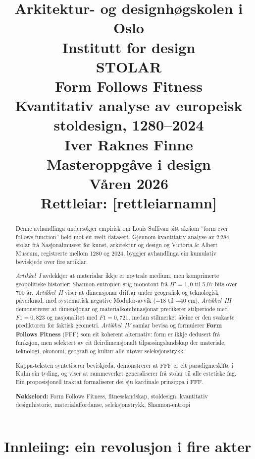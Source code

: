 \documentclass[10pt, a4paper, twocolumn]{article}
\title{%
  \vspace{-2cm}
  {\large Arkitektur- og designhøgskolen i Oslo}\\
  {\large Institutt for design}\\[2cm]
  {\Huge\textbf{STOLAR}}\\[0.5em]
  {\LARGE Form Follows Fitness}\\[0.5em]
  {\large Kvantitativ analyse av europeisk stoldesign, 1280--2024}\\[3cm]
  {\normalsize Iver Raknes Finne}\\[0.5em]
  {\small Masteroppgåve i design}\\
  {\small Våren 2026}\\[1em]
  {\small Rettleiar: [rettleiarnamn]}
}
\author{}
\date{}
\begin{document}
\maketitle
\thispagestyle{empty}
\newpage

\begin{abstract}
\noindent Denne avhandlinga undersøkjer empirisk om Louis Sullivan sitt aksiom ``form ever follows function'' held mot eit reelt datasett. Gjennom kvantitativ analyse av 2\,284 stolar frå Nasjonalmuseet for kunst, arkitektur og design og Victoria \& Albert Museum, registrerte mellom 1280 og 2024, byggjer avhandlinga ein kumulativ beviskjede over fire artiklar.

\emph{Artikkel~I} avdekkjer at materialar ikkje er nøytrale medium, men komprimerte geopolitiske historier: Shannon-entropien stig monotont frå $H' = 1{,}0$ til 5,07 bits over 700 år. \emph{Artikkel~II} viser at dimensjonar driftar under geografisk og teknologisk påverknad, med systematisk negative Modulor-avvik ($-18$ til $-40$ cm). \emph{Artikkel~III} demonstrerer at dimensjonar og materialkombinasjonar predikerer stilperiode med $F1 = 0{,}823$ og nasjonalitet med $F1 = 0{,}721$, medan stilmerket åleine er den svakaste prediktoren for faktisk geometri. \emph{Artikkel~IV} samlar bevisa og formulerer \textbf{Form Follows Fitness} (FFF) som eit koherent alternativ: form er ikkje dedusert frå funksjon, men selektert av eit fleirdimensjonalt tilpassingslandskap der materiale, teknologi, økonomi, geografi og kultur alle utøver seleksjonstrykk.

Kappa-teksten syntetiserer beviskjeda, demonstrerer at FFF er eit paradigmeskifte i Kuhn sin tyding, og viser at rammeverket generaliserer frå stolar til alle estetiske fag. Ein proposisjonell traktat formaliserer dei sju kardinale prinsippa i FFF.

\medskip
\noindent\textbf{Nøkkelord:} Form Follows Fitness, fitnesslandskap, stoldesign, kvantitativ designhistorie, materialaffordanse, seleksjonstrykk, Shannon-entropi
\end{abstract}

\newpage
\tableofcontents
\newpage


\section{Innleiing: ein revolusjon i fire akter}
\end{document}
